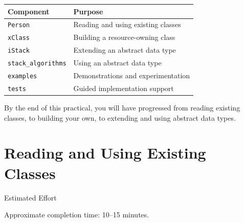 \documentclass{csc2059practical}
\begin{document}
\begin{center}

\begin{tabular}{ll}

\textbf{Component} & \textbf{Purpose}\\
\hline

\texttt{Person} &
Reading and using existing classes \\

\texttt{xClass} &
Building a resource-owning class \\

\texttt{iStack} &
Extending an abstract data type \\

\texttt{stack\_algorithms} &
Using an abstract data type \\

\texttt{examples} &
Demonstrations and experimentation \\

\texttt{tests} &
Guided implementation support \\

\end{tabular}

\end{center}


By the end of this practical, you will have progressed from reading existing
classes, to building your own, to extending and using abstract data types.


\section{Reading and Using Existing Classes}

\begin{infobox}{Estimated Effort}

    Approximate completion time: 10--15 minutes.
    
\end{infobox}
\end{document}
